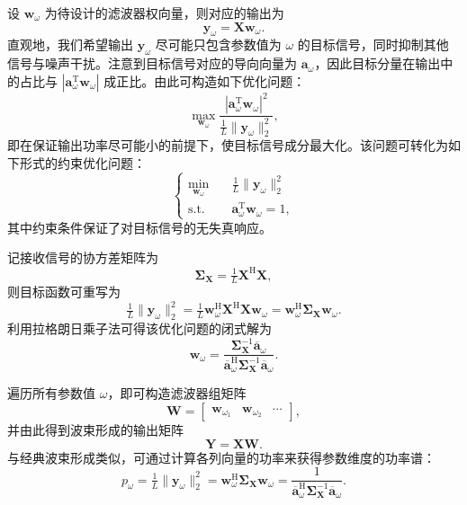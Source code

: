 设 \( \bm{w}_{\omega} \) 为待设计的滤波器权向量，则对应的输出为
\[
    \bm{y}_{\omega} = \mathbf{X} \bm{w}_{\omega}.
\]
直观地，我们希望输出 \(\bm{y}_{\omega}\) 尽可能只包含参数值为 \(\omega\) 的目标信号，同时抑制其他信号与噪声干扰。注意到目标信号对应的导向向量为 \(\bm{a}_{\omega}\)，因此目标分量在输出中的占比与 \(|\bm{a}_{\omega}^{\mathrm{T}} \bm{w}_{\omega}|\) 成正比。由此可构造如下优化问题：
\[
    \max_{\bm{w}_{\omega}} \frac{|\bm{a}_{\omega}^{\mathrm{T}} \bm{w}_{\omega}|^2}{ \tfrac{1}{L} \|\bm{y}_{\omega}\|_2^2},
\]
即在保证输出功率尽可能小的前提下，使目标信号成分最大化。该问题可转化为如下形式的约束优化问题：
\[
    \begin{cases}
        \min_{\bm{w}_{\omega}} \quad & \tfrac{1}{L} \|\bm{y}_{\omega}\|_2^2              \\
        \text{s.t.} \quad            & \bm{a}_{\omega}^{\mathrm{T}} \bm{w}_{\omega} = 1,
    \end{cases}
\]
其中约束条件保证了对目标信号的无失真响应。

记接收信号的协方差矩阵为
\[
    \mathbf{\Sigma}_{\mathbf{X}} = \tfrac{1}{L} \mathbf{X}^{\mathrm{H}} \mathbf{X},
\]
则目标函数可重写为
\[
    \tfrac{1}{L} \|\bm{y}_{\omega}\|_2^2
    = \tfrac{1}{L} \bm{w}_{\omega}^{\mathrm{H}} \mathbf{X}^{\mathrm{H}} \mathbf{X} \bm{w}_{\omega}
    = \bm{w}_{\omega}^{\mathrm{H}} \mathbf{\Sigma}_{\mathbf{X}} \bm{w}_{\omega}.
\]
利用拉格朗日乘子法可得该优化问题的闭式解为
\[
    \bm{w}_{\omega}
    = \frac{\mathbf{\Sigma}_{\mathbf{X}}^{-1} \overline{\bm{a}}_{\omega}}
    {\overline{\bm{a}}_{\omega}^{\mathrm{H}} \mathbf{\Sigma}_{\mathbf{X}}^{-1} \overline{\bm{a}}_{\omega}}.
\]

遍历所有参数值 \(\omega\)，即可构造滤波器组矩阵
\[
    \mathbf{W} = \begin{bmatrix} \bm{w}_{\omega_1} & \bm{w}_{\omega_2} & \cdots \end{bmatrix},
\]
并由此得到波束形成的输出矩阵
\[
    \mathbf{Y} = \mathbf{X} \mathbf{W}.
\]
与经典波束形成类似，可通过计算各列向量的功率来获得参数维度的功率谱：
\[
    p_{\omega}
    = \tfrac{1}{L} \|\bm{y}_{\omega}\|_2^2
    = \bm{w}_{\omega}^{\mathrm{H}} \mathbf{\Sigma}_{\mathbf{X}} \bm{w}_{\omega}
    = \frac{1}{\overline{\bm{a}}_{\omega}^{\mathrm{H}} \mathbf{\Sigma}_{\mathbf{X}}^{-1} \overline{\bm{a}}_{\omega}}.
\]

